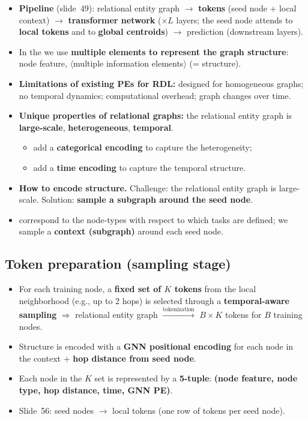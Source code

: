 \begin{itemize}
  \item \textbf{Pipeline} (slide~49): relational entity graph $\to$ \textbf{tokens}
    (seed node + local context) $\to$ \textbf{transformer network} ($\times L$ layers;
    the seed node attends to \textbf{local tokens} and to \textbf{global centroids})
    $\to$ prediction (downstream layers).
  \item In the  we use \textbf{multiple elements to
    represent the graph structure}: node feature, $\langle$multiple information
    elements$\rangle$ (= structure).
  \item \textbf{Limitations of existing PEs for RDL:} designed for homogeneous graphs; no
    temporal dynamics; computational overhead; graph changes over time.
  \item \textbf{Unique properties of relational graphs:} the relational entity graph is
    \textbf{large-scale}, \textbf{heterogeneous}, \textbf{temporal}.
    \begin{itemize}
      \item add a \textbf{categorical encoding} to capture the heterogeneity;
      \item add a \textbf{time encoding} to capture the temporal structure.
    \end{itemize}
  \item \textbf{How to encode structure.} Challenge: the relational entity graph is
    large-scale. Solution: \textbf{sample a subgraph around the seed node}.
  \item {} correspond to the node-types with respect to which
    tasks are defined; we sample a \textbf{context (subgraph)} around each seed node.
\end{itemize}

\subsection{Token preparation (sampling stage)}\label{sec:lec13-sampling}

\begin{itemize}
  \item For each training node, a \textbf{fixed set of $K$ tokens} from the local
    neighborhood (e.g., up to 2 hops) is selected through a \textbf{temporal-aware
    sampling} $\Rightarrow$ relational entity graph $\xrightarrow{\text{tokenization}}$
    $B\times K$ tokens for $B$ training nodes.
  \item Structure is encoded with a \textbf{GNN positional encoding} for each node in the
    context + \textbf{hop distance from seed node}.
  \item Each node in the $K$ set is represented by a \textbf{5-tuple}:
    \textbf{(node feature, node type, hop distance, time, GNN PE)}.
  \item Slide~56: seed nodes $\to$ local tokens (one row of tokens per seed node).
\end{itemize}

